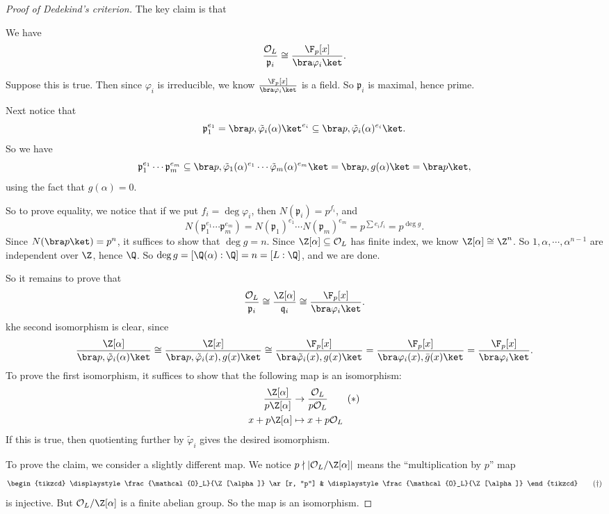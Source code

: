 \documentclass[a4paper]{article}
\begin{document}
\begin{proof}[Proof of Dedekind's criterion]
  The key claim is that
  \begin{claim}
    We have
    \[
      \frac{\mathcal{O}_L}{\mathfrak{p}_i} \cong \frac{\F_p[x]}{\bra \varphi_i\ket}.
    \]
  \end{claim}
  Suppose this is true. Then since $\varphi_i$ is irreducible, we know $\frac{\F_p[x]}{\bra \varphi_i\ket}$ is a field. So $\mathfrak{p}_i$ is maximal, hence prime.

  Next notice that
  \[
    \mathfrak{p}_1^{e_1} = \bra p, \tilde{\varphi}_i(\alpha)\ket^{e_i} \subseteq \bra p, \tilde{\varphi}_i(\alpha)^{e_i}\ket.
  \]
  So we have
  \[
    \mathfrak{p}_1^{e_1} \cdots \mathfrak{p}_m^{e_m} \subseteq \bra p, \tilde{\varphi}_1(\alpha)^{e_1} \cdots \tilde{\varphi}_m(\alpha)^{e_m}\ket = \bra p, g(\alpha)\ket = \bra p\ket,
  \]
  using the fact that $g(\alpha) = 0$.

  So to prove equality, we notice that if we put $f_i = \deg \varphi_i$, then $N(\mathfrak{p}_i) = p^{f_i}$, and
  \[
    N(\mathfrak{p}_1^{e_1} \cdots \mathfrak{p}_m^{e_m}) = N(\mathfrak{p}_1)^{e_1} \cdots N(\mathfrak{p}_m)^{e_m} = p^{\sum e_i f_i} = p^{\deg g}.
  \]
  Since $N(\bra p\ket) = p^n$, it suffices to show that $\deg g = n$. Since $\Z[\alpha] \subseteq \mathcal{O}_L$ has finite index, we know $\Z[\alpha] \cong \Z^n$. So $1,\alpha, \cdots, \alpha^{n - 1}$ are independent over $\Z$, hence $\Q$. So $\deg g = [\Q(\alpha):\Q] = n = [L:\Q]$, and we are done.

  So it remains to prove that
  \[
    \frac{\mathcal{O}_L}{\mathfrak{p}_i} \cong \frac{\Z[\alpha]}{\mathfrak{q}_i} \cong \frac{\F_p[x]}{\bra\varphi_i\ket}.
  \]
  khe second isomorphism is clear, since
  \[
    \frac{\Z[\alpha]}{\bra p, \tilde{\varphi}_i(\alpha)\ket} \cong \frac{\Z[x]}{\bra p, \tilde{\varphi}_i(x), g(x)\ket} \cong \frac{\F_p[x]}{\bra \tilde{\varphi}_i(x), g(x)\ket} = \frac{\F_p[x]}{\bra \varphi_i(x), \bar{g}(x)\ket} = \frac{\F_p[x]}{\bra \varphi_i\ket}.
  \]
  To prove the first isomorphism, it suffices to show that the following map is an isomorphism:
  \begin{align*}
    \frac{\Z[\alpha]}{p\Z[\alpha]} &\to \frac{\mathcal{O}_L}{p\mathcal{O}_L}\tag{$*$}\\
    x + p\Z[\alpha] &\mapsto x + p \mathcal{O}_L
  \end{align*}
  If this is true, then quotienting further by $\tilde{\varphi}_i$ gives the desired isomorphism.

  To prove the claim, we consider a slightly different map. We notice $p \nmid |\mathcal{O}_L/\Z[\alpha]|$ means the ``multiplication by $p$'' map
  \[
    \begin{tikzcd}
      \displaystyle\frac{\mathcal{O}_L}{\Z[\alpha]} \ar[r, "p"] & \displaystyle\frac{\mathcal{O}_L}{\Z[\alpha]}
    \end{tikzcd}\tag{$\dagger$}
  \]
  is injective. But $\mathcal{O}_L/\Z[\alpha]$ is a finite abelian group. So the map is an isomorphism.


\end{proof}
\end{document}
